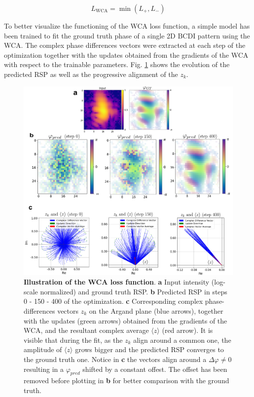 \begin{equation}
    L_{\text{WCA}} = \min\left(L_+, L_-\right)
\label{eq:WCA_2}
\end{equation}

To better visualize the functioning of the WCA loss function, a simple model has been trained to fit the ground truth phase 
of a single 2D BCDI pattern using the WCA. The complex phase differences vectors were extracted at each step of the optimization 
together with the updates obtained from the gradients of the WCA with respect to the trainable parameters. Fig. \ref{fig:WCA} 
shows the evolution of the predicted RSP as well as the progressive alignment of the  $z_k$.
\begin{figure}[H]
    \centering
    \includegraphics[width=.8\textwidth]{figures/Phasing/WCA.pdf}
    \caption{\textbf{Illustration of the WCA loss function}. \textbf{a} Input intensity (log-scale normalized) and
    ground truth RSP. \textbf{b} Predicted RSP in steps 0 - 150 - 400 of the optimization. \textbf{c} Corresponding 
    complex phase-differences vectors $z_k$ on the Argand plane (blue arrows), together with the updates (green arrows) obtained 
    from the gradients of the WCA, and the resultant complex average $\langle z \rangle$ (red arrow). It is visible that 
    during the fit, as the $z_k$ align around a common one, the amplitude of $\langle z \rangle$ grows bigger and the predicted 
    RSP converges to the ground truth one. Notice in \textbf{c} the vectors align around a $\Delta\varphi \neq 0$ resulting 
    in a $\varphi_{pred}$ shifted by a constant offest. The offset has been removed before plotting in \textbf{b} for 
    better comparison with the ground truth.}
    \label{fig:WCA}
\end{figure}

